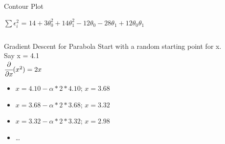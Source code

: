 \documentclass{beamer}
\begin{document}
\begin{frame}{Contour Plot}
	
	$\sum \epsilon_{i}^{2}$ = $14+3\theta_{0}^{2}+14\theta_{1}^{2}-12\theta_{0}-28\theta_{1}+12\theta_{0}\theta_{1}$\\
	
	\begin{columns}
		\pause \begin{column}{0.6\textwidth}
			\begin{adjustbox}{max totalsize={\textwidth},center}
				
			\end{adjustbox}
			
		\end{column}
		\pause \begin{column}{0.5\textwidth}
			\begin{adjustbox}{max totalsize={\textwidth},center}
			\end{adjustbox}
		\end{column}
	\end{columns}
	

	
	
\end{frame}



	\begin{frame}{Gradient Descent for Parabola }
		Start with a random starting point for x.\\ Say x = 4.1\\
		$\cfrac{\partial}{\partial x}(x^2) = 2x$
		
		\begin{itemize}
			\item<+-> $x = 4.10 - \alpha * 2 * 4.10 $; $x = 3.68$
			\item<+-> $x = 3.68 - \alpha * 2 *3.68 $; $x = 3.32$
			\item<+-> $x = 3.32 - \alpha * 2 *3.32 $; $x = 2.98$
			\item<+-> \dots
		\end{itemize}
		
		
	\end{frame}
	
\end{document}

